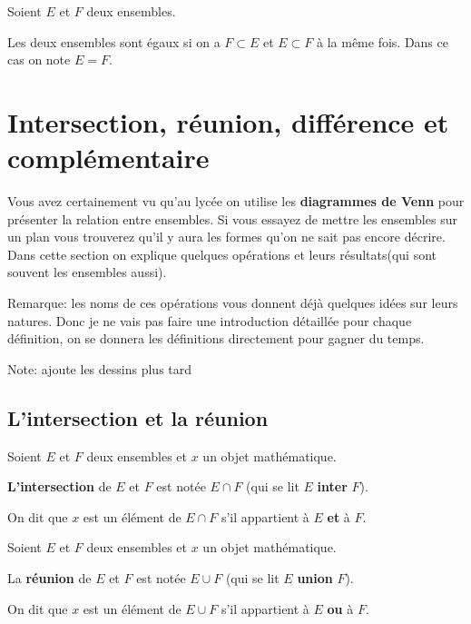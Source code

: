 \documentclass{article}
\begin{document}
\begin{tcolorbox}[colback=red!5!white,colframe=red!75!black,title=Définition 2.2]

Soient $E$ et $F$ deux ensembles. 

Les deux ensembles sont égaux si on a $F \subset E$ et $E \subset F$ à la même fois. Dans ce cas on note $E = F$.


\end{tcolorbox}




\section{Intersection, réunion, différence et complémentaire}

Vous avez certainement vu qu'au lycée on utilise les \textbf{diagrammes de Venn} pour présenter la relation entre ensembles. Si vous essayez de mettre les ensembles sur un plan vous trouverez qu'il y aura les formes qu'on ne sait pas encore décrire. Dans cette section on explique quelques opérations et leurs résultats(qui sont souvent les ensembles aussi).

Remarque: les noms de ces opérations vous donnent déjà quelques idées sur leurs natures. Donc je ne vais pas faire une introduction détaillée pour chaque définition, on se donnera les définitions directement pour gagner du temps.

Note: ajoute les dessins plus tard

\subsection{L'intersection et la réunion}


\begin{tcolorbox}[colback=red!5!white,colframe=red!75!black,title=Définition 2.3]

Soient $E$ et $F$ deux ensembles et $x$ un objet mathématique. 

\textbf{L'intersection} de $E$ et $F$ est notée $E \cap F$ (qui se lit $E$ \textbf{inter} $F$).

On dit que $x$ est un élément de $E \cap F$ s'il appartient à $E$ \textbf{et} à $F$.

\end{tcolorbox}

\begin{tcolorbox}[colback=red!5!white,colframe=red!75!black,title=Définition 2.4]

Soient $E$ et $F$ deux ensembles et $x$ un objet mathématique. 

La \textbf{réunion} de $E$ et $F$ est notée $E \cup F$ (qui se lit $E$ \textbf{union} $F$).

On dit que $x$ est un élément de $E \cup F$ s'il appartient à $E$ \textbf{ou} à $F$.

\end{tcolorbox}
\end{document}
